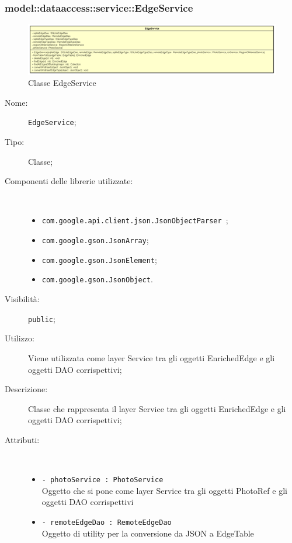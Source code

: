 \documentclass[../DefinizioneDiProdotto.tex]{subfiles}
\begin{document}
\subsubsection{model::dataaccess::service::EdgeService}

    \begin{figure}[H]
        \centering
        \includegraphics{img/EdgeService.png}
        \caption{Classe EdgeService}\label{fig:model::dataaccess::service::EdgeService} 
    \end{figure}
    \begin{description}
\item[Nome:] \texttt{EdgeService};
\item[Tipo:] Classe;
\item[Componenti delle librerie utilizzate:] \
\begin{itemize}
\item \texttt{com.google.api.client.json.JsonObjectParser
};

\item \texttt{com.google.gson.JsonArray};

\item \texttt{com.google.gson.JsonElement};

\item \texttt{com.google.gson.JsonObject}.

\end{itemize}
\item[Visibilità:] \texttt{public};
\item[Utilizzo:] Viene utilizzata come layer Service tra gli oggetti EnrichedEdge e gli oggetti DAO corrispettivi;
\item[Descrizione:] Classe che rappresenta il layer Service tra gli oggetti EnrichedEdge e gli oggetti DAO corrispettivi;
\item[Attributi:] \
\begin{itemize}
\item \texttt{- photoService : PhotoService}\\
Oggetto che si pone come layer Service tra gli oggetti PhotoRef e gli oggetti DAO corrispettivi

\item \texttt{- remoteEdgeDao : RemoteEdgeDao}\\
Oggetto di utility per la conversione da JSON a EdgeTable


\end{itemize}
\end{description}
\end{document}
